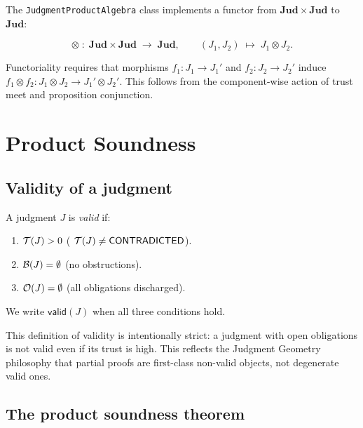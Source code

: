 \documentclass[11pt]{article}
\newcommand{\Jprod}{\mathbin{\otimes}}            %
\newcommand{\JprodN}[2]{#1 \Jprod #2}             %
\newcommand{\Valid}[1]{\mathsf{valid}(#1)}        %
\newcommand{\ProdCat}{\mathbf{Jud}}               %
\begin{document}
The \texttt{JudgmentProductAlgebra} class implements a functor from
$\ProdCat \times \ProdCat$ to $\ProdCat$:

\begin{equation}\label{eq:functor}
  \otimes \;:\; \ProdCat \times \ProdCat \;\longrightarrow\; \ProdCat,
  \qquad
  (J_1, J_2) \;\longmapsto\; \JprodN{J_1}{J_2}.
\end{equation}

Functoriality requires that morphisms $f_1 : J_1 \to J_1'$ and
$f_2 : J_2 \to J_2'$ induce $f_1 \otimes f_2 : \JprodN{J_1}{J_2} \to
\JprodN{J_1'}{J_2'}$.  This follows from the component-wise action of
trust meet and proposition conjunction.

\section{Product Soundness}\label{sec:soundness}

\subsection{Validity of a judgment}

\begin{definition}\label{def:valid}
A judgment $J$ is \emph{valid} if:
\begin{enumerate}[label=(\roman*)]
  \item $\mathcal{T}(J) > 0$ (\ie{} $\mathcal{T}(J) \neq \mathsf{CONTRADICTED}$).
  \item $\mathcal{B}(J) = \emptyset$ (no obstructions).
  \item $\mathcal{O}(J) = \emptyset$ (all obligations discharged).
\end{enumerate}
We write $\Valid{J}$ when all three conditions hold.
\end{definition}

\begin{remark}
This definition of validity is intentionally strict: a judgment with
open obligations is not valid even if its trust is high.  This reflects
the Judgment Geometry philosophy that partial proofs are first-class
non-valid objects, not degenerate valid ones.
\end{remark}

\subsection{The product soundness theorem}
\end{document}
